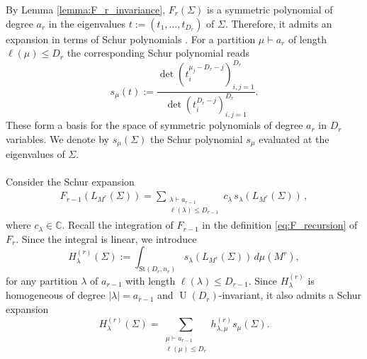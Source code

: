 \documentclass{article}
\theoremstyle{definition}
\DeclareMathOperator{\U}{U}
\newcommand{\C}{\mathbb{C}}
\newcommand{\St}{\mathrm{St}}
\begin{document}
By Lemma \ref{lemma:F_r_invariance}, $F_r(\Sigma)$ is a symmetric polynomial of degree $a_r$ in the eigenvalues $t:=(t_1,\dots,t_{D_r})$ of \(\Sigma\). Therefore, it admits an expansion in terms of Schur polynomials \cite{Macdonald_1995}. For a partition $\mu \vdash a_r$ of length $\ell(\mu) \leq D_{r}$ the corresponding Schur polynomial reads
    \begin{equation}\label{eq:schur}
        s_{\mu}(t) := \frac{\det(t_i^{\mu_j-D_r-j})_{i,j=1}^{D_r}}{\det(t_i^{D_r-j})_{i,j=1}^{D_r}}.
    \end{equation}
These form a basis for the space of symmetric polynomials of degree $a_r$ in $D_r$ variables. We denote by $s_{\mu}(\Sigma)$ the Schur polynomial $s_{\mu}$ evaluated at the eigenvalues of $\Sigma$. 
\\~\\
Consider the Schur expansion
\begin{align}\label{eq:c}
    F_{r-1}(L_{M^r}(\Sigma)) = \sum_{\substack{\lambda\vdash a_{r-1}\\ \ell(\lambda)\le D_{r-1}}} c_{\lambda}\,s_{\lambda}(L_{M^r}(\Sigma)) \, ,
\end{align}
where $c_{\lambda} \in \C$. Recall the integration of $F_{r-1}$ in the definition \eqref{eq:F_recursion} of $F_r$. Since the integral is linear, we introduce 
\begin{equation}\label{eq:H_function}
    H_\lambda^{(r)}(\Sigma)
:=
\int_{\St(D_r,n_r)}
s_\lambda\!\left(L_{M^r}(\Sigma)\right)
\,d\mu(M^r),
\end{equation}
for any partition $\lambda$ of $a_{r-1}$ with length $\ell(\lambda) \leq D_{r-1}$. 
Since \(H_\lambda^{(r)}\) is homogeneous of degree $|\lambda|=a_{r-1}$ and
\(\U(D_r)\)-invariant, it also admits a Schur expansion
\begin{equation}\label{eq:H_function_exp}
    H_\lambda^{(r)}(\Sigma)
=
\sum_{\substack{\mu\vdash a_{r-1}\\ \ell(\mu)\le D_r}}
h_{\lambda,\mu}^{(r)}s_\mu(\Sigma).
\end{equation}
\end{document}
